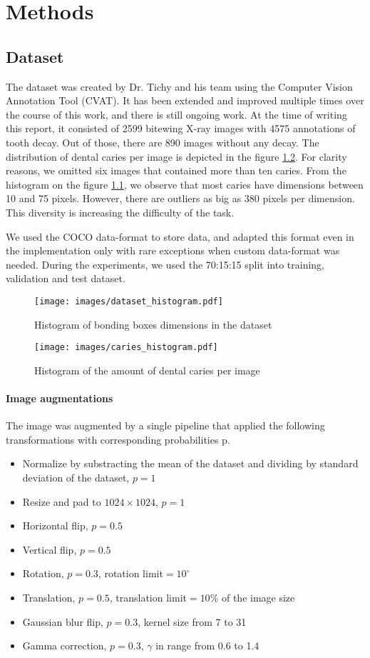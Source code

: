 \chapter{Methods}
\label{chapter:methods}
\section{Dataset}
The dataset was created by Dr. Tichy and his team using the Computer Vision Annotation Tool (CVAT). It has been extended and improved multiple times over the course of this work, and there is still ongoing work. At the time of writing this report, it consisted of 2599 bitewing X-ray images with 4575 annotations of tooth decay. Out of those, there are 890 images without any decay. The distribution of dental caries per image is depicted in the figure \ref{fig:hist_caries_per_img}. For clarity reasons, we omitted six images that contained more than ten caries. From the histogram on the figure \ref{fig:hist_caries_dim}, we observe that most caries have dimensions between 10 and 75 pixels. However, there are outliers as big as 380 pixels per dimension. This diversity is increasing the difficulty of the task.

We used the COCO data-format to store data, and adapted this format even in the implementation only with rare exceptions when custom data-format was needed. During the experiments, we used the 70:15:15 split into training, validation and test dataset.
\begin{figure}
    \texttt{[image: images/dataset\_histogram.pdf]}
    \caption{Histogram of bonding boxes dimensions in the dataset}
    \label{fig:hist_caries_dim}
\end{figure}

\begin{figure}
    \texttt{[image: images/caries\_histogram.pdf]}
    \caption{Histogram of the amount of dental caries per image}
    \label{fig:hist_caries_per_img}
\end{figure}
\subsubsection{Image augmentations}
The image was augmented by a single pipeline that applied the following transformations with corresponding probabilities p.
\begin{itemize}
    \item Normalize by substracting the mean of the dataset and dividing by standard deviation of the dataset, $p=1$
    \item Resize and pad to $1024\times1024$, $p=1$
    \item Horizontal flip, $p=0.5$
    \item Vertical flip, $p=0.5$
    \item Rotation, $p=0.3$, rotation limit$=10^{\circ}$
    \item Translation, $p=0.5$, translation limit$=10\%$ of the image size
    \item Gaussian blur flip, $p=0.3$, kernel size from 7 to 31
    \item Gamma correction, $p=0.3$, $\gamma$ in range from 0.6 to 1.4
\end{itemize}

